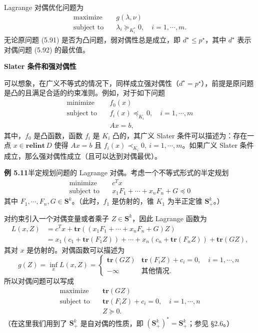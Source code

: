 \documentclass[UTF8,12pt,a4paper,fontset=fandol]{ctexart}
\begin{document}
Lagrange 对偶优化问题为
\begin{equation}
\begin{aligned}
\text{maximize}\quad & g(\lambda,\nu)\\
\text{subject to}\quad & \lambda_i\succeq_{K_i^\ast}0,\quad i=1,\cdots,m.
\end{aligned}
\tag{5.92}
\end{equation}
无论原问题 (5.91) 是否为凸问题，弱对偶性总是成立，即 $d^\star\leq p^\star$，其中 $d^\star$ 表示对偶问题 (5.92) 的最优值。

\noindent\textbf{Slater 条件和强对偶性}

可以想象，在广义不等式的情况下，同样成立强对偶性（$d^\star=p^\star$），前提是原问题是凸的且满足合适的约束准则。例如，对于如下问题
\[
\begin{aligned}
\text{minimize}\quad & f_0(x)\\
\text{subject to}\quad & f_i(x)\preceq_{K_i}0,\quad i=1,\cdots,m\\
& Ax=b,
\end{aligned}
\]
其中，$f_0$ 是凸函数，函数 $f_i$ 是 $K_i$ 凸的，其广义 Slater 条件可以描述为：存在一点 $x\in\mathbf{relint}\,D$ 使得 $Ax=b$ 且 $f_i(x)\prec_{K_i}0,\ i=1,\cdots,m$。如果广义 Slater 条件成立，那么强对偶性成立（且可以达到对偶最优）。

\noindent\textbf{例 5.11}\quad 半定规划问题的 Lagrange 对偶。考虑一个不等式形式的半定规划
\begin{equation}
\begin{aligned}
\text{minimize}\quad & c^Tx\\
\text{subject to}\quad & x_1F_1+\cdots+x_nF_n+G\preceq 0
\end{aligned}
\tag{5.93}
\end{equation}
其中 $F_1,\cdots,F_n,G\in\mathbf{S}^k$。（此时，$f_1$ 是仿射的，锥 $K_1$ 为半正定锥 $\mathbf{S}_+^k$。）

对约束引入一个对偶变量或者乘子 $Z\in\mathbf{S}^k$，因此 Lagrange 函数为
\[
\begin{aligned}
L(x,Z)
&=c^Tx+\mathbf{tr}((x_1F_1+\cdots+x_nF_n+G)Z)\\
&=x_1(c_1+\mathbf{tr}(F_1Z))+\cdots+x_n(c_n+\mathbf{tr}(F_nZ))+\mathbf{tr}(GZ),
\end{aligned}
\]
其对 $x$ 是仿射的。对偶函数可以描述为
\[
g(Z)=\inf_x L(x,Z)=
\begin{cases}
\mathbf{tr}(GZ) & \mathbf{tr}(F_iZ)+c_i=0,\quad i=1,\cdots,n\\
-\infty & \text{其他情况}.
\end{cases}
\]
所以对偶问题可以写成
\[
\begin{aligned}
\text{maximize}\quad & \mathbf{tr}(GZ)\\
\text{subject to}\quad & \mathbf{tr}(F_iZ)+c_i=0,\quad i=1,\cdots,n\\
& Z\succeq 0.
\end{aligned}
\]
（在这里我们用到了 $\mathbf{S}_+^k$ 是自对偶的性质，即 $(\mathbf{S}_+^k)^\ast=\mathbf{S}_+^k$；参见 §2.6。）
\end{document}
